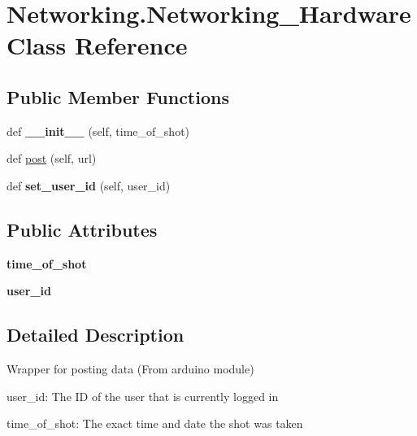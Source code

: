 \hypertarget{classNetworking_1_1Networking__Hardware}{}\section{Networking.\+Networking\+\_\+\+Hardware Class Reference}
\label{classNetworking_1_1Networking__Hardware}
\subsection*{Public Member Functions}
\begin{DoxyCompactItemize}
\item 
\mbox{\label{classNetworking_1_1Networking__Hardware_a9fb8d6f9eefae309eddb28b2210a54d9}} 
def {\bfseries \+\_\+\+\_\+init\+\_\+\+\_\+} (self, time\+\_\+of\+\_\+shot)
\item 
def \hyperlink{classNetworking_1_1Networking__Hardware_abf6c684c8234f0554adf0d615d2b796a}{post} (self, url)
\item 
\mbox{\label{classNetworking_1_1Networking__Hardware_a5db93690d67dc0348534ed7f8c7a29f4}} 
def {\bfseries set\+\_\+user\+\_\+id} (self, user\+\_\+id)
\end{DoxyCompactItemize}
\subsection*{Public Attributes}
\begin{DoxyCompactItemize}
\item 
\mbox{\label{classNetworking_1_1Networking__Hardware_a505b30dca4994c3442eea32f01bb6bb3}} 
{\bfseries time\+\_\+of\+\_\+shot}
\item 
\mbox{\label{classNetworking_1_1Networking__Hardware_ac4bc0d6a80c5e2a4bd7f18c613c1b627}} 
{\bfseries user\+\_\+id}
\end{DoxyCompactItemize}


\subsection{Detailed Description}
\begin{DoxyVerb}Wrapper for posting data (From arduino module) \end{DoxyVerb}
\begin{DoxyVerb}user_id: The ID of the user that is currently logged in \end{DoxyVerb}
\begin{DoxyVerb}time_of_shot: The exact time and date the shot was taken \end{DoxyVerb}
 

